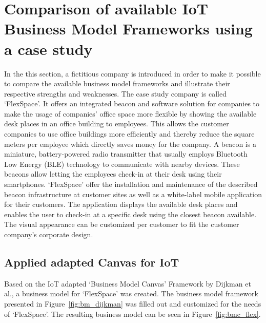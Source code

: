 \section{Comparison of available IoT Business Model Frameworks using a case study}
\label{sec:bmf_comparison}
\vspace{-1em}
	In the this section, a fictitious company is introduced in order to make it possible to compare the available business model frameworks and illustrate their respective strengths and weaknesses.
	The case study company is called `FlexSpace'. It offers an integrated beacon and software solution for companies to make the usage of companies' office space more flexible by showing the available desk places in an office building to employees. This allows the customer companies to use office buildings more efficiently and thereby reduce the square meters per employee which directly saves money for the company. A beacon is a miniature, battery-powered radio transmitter that usually employs  Bluetooth Low Energy (BLE) technology to communicate with nearby devices. These beacons allow letting the employees check-in at their desk using their smartphones. `FlexSpace' offer the installation and maintenance of the described beacon infrastructure at customer sites as well as a white-label mobile application for their customers. The application displays the available desk places and enables the user to check-in at a specific desk using the closest beacon available. The visual appearance can be customized per customer to fit the customer company's corporate design.
	\vspace{-1em}
	\subsection{Applied adapted Canvas for IoT}
	\vspace{-1em}
		Based on the IoT adapted `Business Model Canvas' Framework by Dijkman et al., a business model for `FlexSpace' was created. The business model framework presented in Figure~\ref{fig:bm_dijkman} was filled out and customized for the needs of `FlexSpace'. The resulting business model can be seen in Figure~\ref{fig:bmc_flex}.

